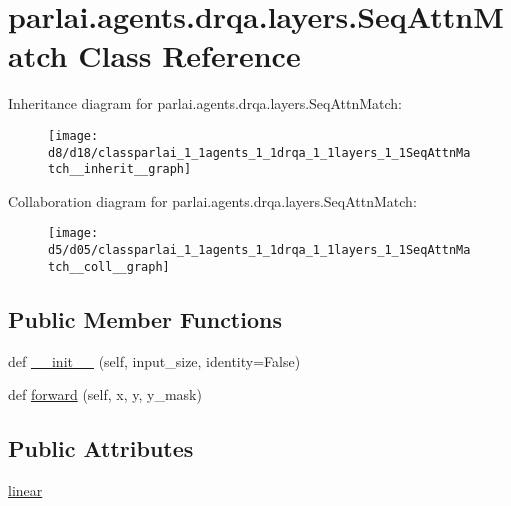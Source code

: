 \hypertarget{classparlai_1_1agents_1_1drqa_1_1layers_1_1SeqAttnMatch}{}\section{parlai.\+agents.\+drqa.\+layers.\+Seq\+Attn\+Match Class Reference}
\label{classparlai_1_1agents_1_1drqa_1_1layers_1_1SeqAttnMatch}


Inheritance diagram for parlai.\+agents.\+drqa.\+layers.\+Seq\+Attn\+Match\+:
\nopagebreak
\begin{figure}[H]
\begin{center}
\leavevmode
\texttt{[image: d8/d18/classparlai\_1\_1agents\_1\_1drqa\_1\_1layers\_1\_1SeqAttnMatch\_\_inherit\_\_graph]}
\end{center}
\end{figure}


Collaboration diagram for parlai.\+agents.\+drqa.\+layers.\+Seq\+Attn\+Match\+:
\nopagebreak
\begin{figure}[H]
\begin{center}
\leavevmode
\texttt{[image: d5/d05/classparlai\_1\_1agents\_1\_1drqa\_1\_1layers\_1\_1SeqAttnMatch\_\_coll\_\_graph]}
\end{center}
\end{figure}
\subsection*{Public Member Functions}
\begin{DoxyCompactItemize}
\item 
def \hyperlink{classparlai_1_1agents_1_1drqa_1_1layers_1_1SeqAttnMatch_abd3be7cddadf751a880aab03c55b0a6c}{\+\_\+\+\_\+init\+\_\+\+\_\+} (self, input\+\_\+size, identity=False)
\item 
def \hyperlink{classparlai_1_1agents_1_1drqa_1_1layers_1_1SeqAttnMatch_ade14c6394d52f566a64da6573e8c913b}{forward} (self, x, y, y\+\_\+mask)
\end{DoxyCompactItemize}
\subsection*{Public Attributes}
\begin{DoxyCompactItemize}
\item 
\hyperlink{classparlai_1_1agents_1_1drqa_1_1layers_1_1SeqAttnMatch_a6332862a9596fe3e4cb3c323b818a42f}{linear}
\end{DoxyCompactItemize}


